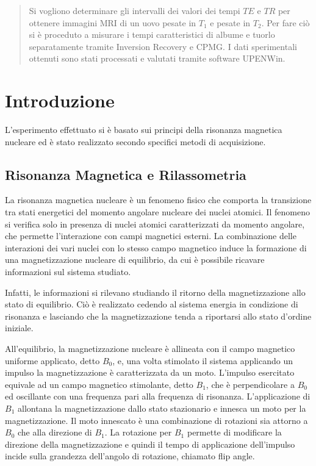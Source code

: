 \begin{abstract}

Si vogliono determinare gli intervalli dei valori dei tempi $TE$ e $TR$ per ottenere immagini MRI di un uovo pesate in $T_1$ e pesate in $T_2$. Per fare ciò si è proceduto a misurare i tempi caratteristici di albume e tuorlo separatamente tramite Inversion Recovery e CPMG. I dati sperimentali ottenuti sono stati processati e valutati tramite software UPENWin.

\end{abstract}

\section*{Introduzione}
L'esperimento effettuato si è basato sui principi della risonanza magnetica nucleare ed è stato realizzato secondo specifici metodi di acquisizione. 

\subsection*{Risonanza Magnetica e Rilassometria}

La risonanza magnetica nucleare è un fenomeno fisico che comporta la transizione tra stati energetici del momento angolare nucleare dei nuclei atomici.
Il fenomeno si verifica solo in presenza di nuclei atomici caratterizzati da momento angolare, che permette l'interazione con campi magnetici esterni.
La combinazione delle interazioni dei vari nuclei con lo stesso campo magnetico induce la formazione di una magnetizzazione nucleare di equilibrio, da cui è possibile ricavare informazioni sul sistema studiato.

Infatti, le informazioni si rilevano studiando il ritorno della magnetizzazione allo stato di equilibrio.
Ciò è realizzato cedendo al sistema energia in condizione di risonanza e lasciando che la magnetizzazione tenda a riportarsi allo stato d'ordine iniziale. 

All'equilibrio, la magnetizzazione nucleare è allineata con il campo magnetico uniforme applicato, detto $B_0$, e, una volta stimolato il sistema applicando un impulso la magnetizzazione è caratterizzata da un moto.
L'impulso esercitato equivale ad un campo magnetico stimolante, detto $B_1$, che è perpendicolare a $B_0$ ed oscillante con una frequenza pari alla frequenza di risonanza. 
L'applicazione di $B_1$ allontana la magnetizzazione dallo stato stazionario e innesca un moto per la magnetizzazione.
Il moto innescato è una combinazione di rotazioni sia attorno a $B_0$ che alla direzione di $B_1$.
La rotazione per $B_1$ permette di modificare la direzione della magnetizzazione e quindi il tempo di applicazione dell'impulso incide sulla grandezza dell'angolo di rotazione, chiamato flip angle.

